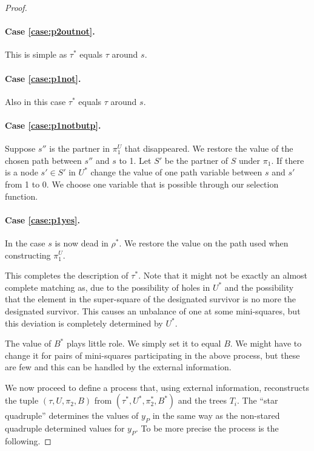 \documentclass{theoretics}
\begin{document}
\begin{proof}
\paragraph{Case \ref{case:p2outnot}.}  This is simple as $\tau^*$
equals $\tau$ around $s$.

\paragraph{Case \ref{case:p1not}.}  Also in this case $\tau^*$
equals $\tau$ around $s$.

\paragraph{Case \ref{case:p1notbutp}.}  Suppose $s''$
is the partner in $\pi_1^U$ that disappeared.
We restore the value of the chosen path
between $s''$ and $s$ to 1.  Let $S'$ be
the partner of $S$ under $\pi_1$.  
If there is a node $s' \in S'$ in $U^*$
change the value of one path variable between $s$ and $s'$
from 1 to 0.  We choose one variable that is possible
through our selection function.

\paragraph{Case \ref{case:p1yes}.}
In the case $s$ is now dead in $\rho^*$. We restore
the value on the path used when constructing $\pi_1^U$.

This completes the description of $\tau^*$.  Note that
it might not be exactly an almost complete matching as, due
to the possibility of holes in $U^*$ and the possibility that
the element in the super-square of the designated survivor
is no more the designated survivor.
This causes an unbalance of one at some mini-squares,
but this deviation is completely determined by $U^*$.

The value of $B^*$  plays little role.  We simply set it
to equal $B$.  We might have to change it for 
pairs of mini-squares participating in the above
process, but these are few and this can be handled
by the external information.

We now proceed to define a process that, using external information,
reconstructs the tuple $(\tau, U, \pi_2, B)$ from
$(\tau^*, U^*, \pi_2^*, B^*)$ and the trees $T_i$.
The ``star quadruple'' determines the values of
$y_P$ in the same way as the non-stared
quadruple determined values for $y_P$.  To be more
precise the process is the following.


\end{proof}
\end{document}
